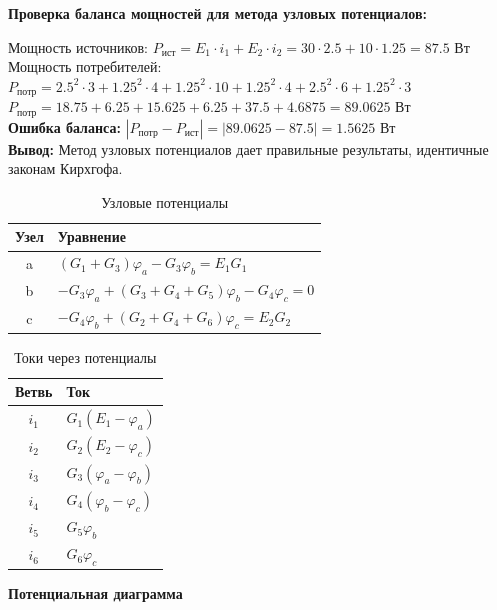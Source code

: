 \textbf{Проверка баланса мощностей для метода узловых потенциалов:}
\begin{flushleft}
Мощность источников: $P_{ист} = E_1 \cdot i_1 + E_2 \cdot i_2 = 30 \cdot 2.5 + 10 \cdot 1.25 = 87.5$ Вт \\
Мощность потребителей: $P_{потр} = 2.5^2 \cdot 3 + 1.25^2 \cdot 4 + 1.25^2 \cdot 10 + 1.25^2 \cdot 4 + 2.5^2 \cdot 6 + 1.25^2 \cdot 3$ \\
$P_{потр} = 18.75 + 6.25 + 15.625 + 6.25 + 37.5 + 4.6875 = 89.0625$ Вт \\
\textbf{Ошибка баланса:} $|P_{потр} - P_{ист}| = |89.0625 - 87.5| = 1.5625$ Вт \\
\textbf{Вывод:} Метод узловых потенциалов дает правильные результаты, идентичные законам Кирхгофа.
\end{flushleft}
\begin{table}[H]
\centering
\begin{tabular}{|c|l|}
\hline
\textbf{Узел} & \textbf{Уравнение} \\
\hline
a & $(G_1 + G_3)\varphi_a - G_3\varphi_b = E_1 G_1$ \\
\hline
b & $-G_3\varphi_a + (G_3 + G_4 + G_5)\varphi_b - G_4\varphi_c = 0$ \\
\hline
c & $-G_4\varphi_b + (G_2 + G_4 + G_6)\varphi_c = E_2 G_2$ \\
\hline
\end{tabular}
\caption{Узловые потенциалы}
\label{tab:nodal_potential_equations}
\end{table}

\begin{table}[H]
\centering
\begin{tabular}{|c|l|}
\hline
\textbf{Ветвь} & \textbf{Ток} \\
\hline
$i_1$ & $G_1(E_1 - \varphi_a)$ \\
\hline
$i_2$ & $G_2(E_2 - \varphi_c)$ \\
\hline
$i_3$ & $G_3(\varphi_a - \varphi_b)$ \\
\hline
$i_4$ & $G_4(\varphi_b - \varphi_c)$ \\
\hline
$i_5$ & $G_5\varphi_b$ \\
\hline
$i_6$ & $G_6\varphi_c$ \\
\hline
\end{tabular}
\caption{Токи через потенциалы}
\label{tab:nodal_current_calculations}
\end{table}

\textbf{Потенциальная диаграмма}

